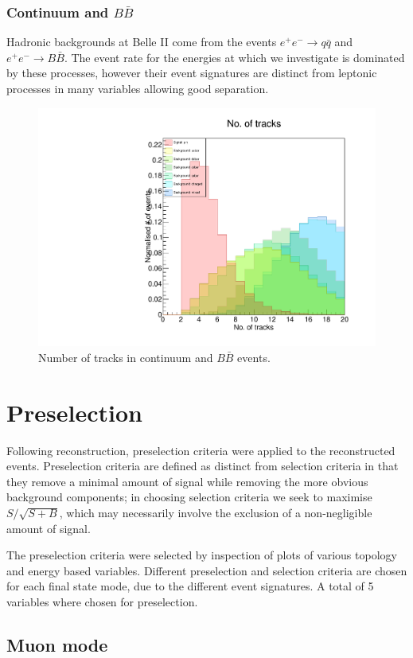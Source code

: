 \documentclass[12pt]{thesis}  %
\begin{document}
\subsection{Continuum and $B\bar{B}$}

Hadronic backgrounds at Belle II come from the events $e^+ e^- \to q\bar{q}$ and $e^+ e^- \to B \bar{B}$. The event rate for the energies at which we investigate is dominated by these processes, however their event signatures are distinct from leptonic processes in many variables allowing good separation. 

\begin{figure}[h]
\centering
  \includegraphics[width=0.5\linewidth]{images/hadronic-tracks.pdf}
  \caption[]%
  {\small Number of tracks in continuum and $B\bar{B}$ events.}
  \label{fig:hadronic tracks}
\end{figure}

\pagebreak


\chapter{Preselection}

Following reconstruction, preselection criteria were applied to the reconstructed events. Preselection criteria are defined as distinct from selection criteria in that they remove a minimal amount of signal while removing the more obvious background components; in choosing selection criteria we seek to maximise $S/\sqrt{S+B}$, which may necessarily involve the exclusion of a non-negligible amount of signal.

The preselection criteria were selected by inspection of plots of various topology and energy based variables. Different preselection and selection criteria are chosen for each final state mode, due to the different event signatures. A total of 5 variables where chosen for preselection.

\section{Muon mode}
\end{document}
